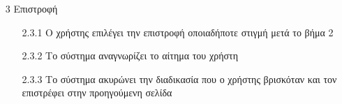 \documentclass[12pt,a4paper,twoside]{book}
\begin{document}
\begin{enumerate}
  \item[3 ] Επιστροφή
        \begin{enumerate}
          \item[2.3.1 ] Ο χρήστης επιλέγει την επιστροφή οποιαδήποτε στιγμή μετά το βήμα 2 %
          \item[2.3.2 ] Το σύστημα αναγνωρίζει το αίτημα του χρήστη %
          \item[2.3.3 ] Το σύστημα ακυρώνει την διαδικασία που ο χρήστης βρισκόταν και τον επιστρέφει στην προηγούμενη σελίδα %
        \end{enumerate}
\end{enumerate}
\end{document}
